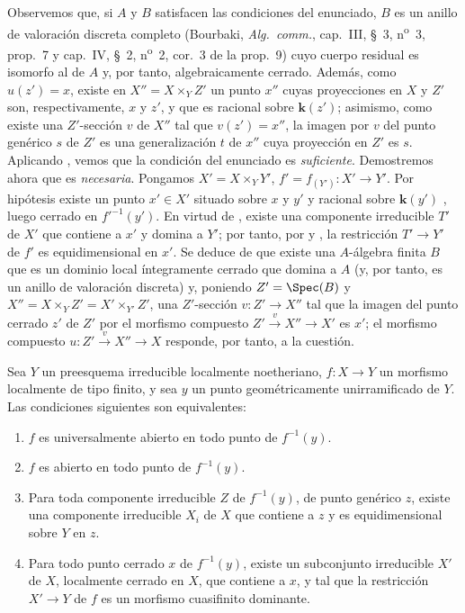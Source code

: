 Observemos que, si $A$ y $B$ satisfacen las condiciones del enunciado, $B$ es un anillo de valoración discreta completo (Bourbaki, \emph{Alg.\ comm.}, cap.~III, \S~3, n\textsuperscript{o}~3, prop.~7 y cap.~IV, \S~2, n\textsuperscript{o}~2, cor.~3 de la prop.~9) cuyo cuerpo residual es isomorfo al de $A$ y, por tanto, algebraicamente cerrado. Además, como $u(z')=x$, existe en $X''=X\times_Y Z'$ un punto $x''$ cuyas proyecciones en $X$ y $Z'$ son, respectivamente, $x$ y $z'$, y que es racional sobre $\boldsymbol{k}(z')$; asimismo, como existe una $Z'$-sección $v$ de $X''$ tal que $v(z')=x''$, la imagen por $v$ del punto genérico $s$ de $Z'$ es una generalización $t$ de $x''$ cuya proyección en $Z'$ es $s$. Aplicando , vemos que la condición del enunciado es \emph{suficiente}.
Demostremos ahora que es \emph{necesaria}.
Pongamos $X'=X\times_Y Y'$, $f'=f_{(Y')}:X'\to Y'$.
Por hipótesis existe un punto $x'\in X'$ situado sobre $x$ y $y'$ y racional sobre $\boldsymbol{k}(y')$ , luego cerrado en $f'^{-1}(y')$.
En virtud de , existe una componente irreducible $T'$ de $X'$ que contiene a $x'$ y domina a $Y'$; por tanto, por  y , la restricción $T'\to Y'$ de $f'$ es equidimensional en $x'$.
Se deduce de  que existe una $A$-álgebra finita $B$ que es un dominio local íntegramente cerrado que domina a $A$ (y, por tanto, es un anillo de valoración discreta) y, poniendo $Z'=\Spec(B)$ y $X''=X\times_Y Z'=X'\times_{Y'}Z'$, una $Z'$-sección $v:Z'\to X''$ tal que la imagen del punto cerrado $z'$ de $Z'$ por el morfismo compuesto $Z'\xrightarrow{v}X''\to X'$ es $x'$; el morfismo compuesto $u:Z'\xrightarrow{v}X''\to X$ responde, por tanto, a la cuestión.

\begin{proposition}[14.5.9]
\label{IV.14.5.9}
Sea $Y$ un preesquema irreducible localmente noetheriano, $f:X\to Y$ un morfismo localmente de tipo finito, y sea $y$ un punto \textup{geométricamente unirramificado} de $Y$.
Las condiciones siguientes son equivalentes:
\begin{enumerate}[label=\emph{\alph*)}]
  \item $f$ es universalmente abierto en todo punto de $f^{-1}(y)$.
  \item $f$ es abierto en todo punto de $f^{-1}(y)$.
  \item Para toda componente irreducible $Z$ de $f^{-1}(y)$, de punto genérico $z$, existe una componente irreducible $X_i$ de $X$ que contiene a $z$ y es equidimensional sobre $Y$ en $z$.
  \item Para todo punto cerrado $x$ de $f^{-1}(y)$, existe un subconjunto irreducible $X'$ de $X$, localmente cerrado en $X$, que contiene a $x$, y tal que la restricción $X'\to Y$ de $f$ es un morfismo cuasifinito dominante.
\end{enumerate}
\end{proposition}

